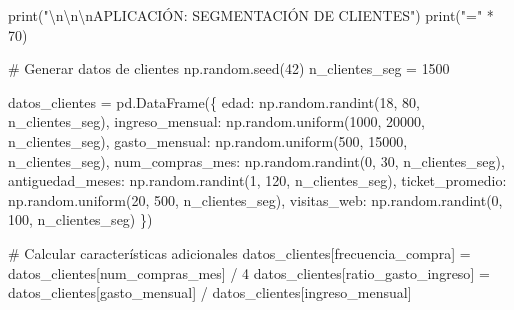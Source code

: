 \documentclass[
  doc,
  floatsintext,
  longtable,
  a4paper,
  nolmodern,
  notxfonts,
  notimes,
  12pt,
  colorlinks=true,linkcolor=blue,citecolor=blue,urlcolor=blue]{apa7}
\newenvironment{Shaded}{\begin{snugshade}}{\end{snugshade}}
\newcommand{\BuiltInTok}[1]{\textcolor[rgb]{0.00,0.23,0.31}{#1}}
\newcommand{\CharTok}[1]{\textcolor[rgb]{0.13,0.47,0.30}{#1}}
\newcommand{\CommentTok}[1]{\textcolor[rgb]{0.37,0.37,0.37}{#1}}
\newcommand{\DecValTok}[1]{\textcolor[rgb]{0.68,0.00,0.00}{#1}}
\newcommand{\NormalTok}[1]{\textcolor[rgb]{0.00,0.23,0.31}{#1}}
\newcommand{\OperatorTok}[1]{\textcolor[rgb]{0.37,0.37,0.37}{#1}}
\newcommand{\StringTok}[1]{\textcolor[rgb]{0.13,0.47,0.30}{#1}}
\begin{document}
\begin{Shaded}
\begin{Highlighting}[]
\BuiltInTok{print}\NormalTok{(}\StringTok{"}\CharTok{\textbackslash{}n\textbackslash{}n\textbackslash{}n}\StringTok{APLICACIÓN: SEGMENTACIÓN DE CLIENTES"}\NormalTok{)}
\BuiltInTok{print}\NormalTok{(}\StringTok{"="} \OperatorTok{*} \DecValTok{70}\NormalTok{)}

\CommentTok{\# Generar datos de clientes}
\NormalTok{np.random.seed(}\DecValTok{42}\NormalTok{)}
\NormalTok{n\_clientes\_seg }\OperatorTok{=} \DecValTok{1500}

\NormalTok{datos\_clientes }\OperatorTok{=}\NormalTok{ pd.DataFrame(\{}
    \StringTok{\textquotesingle{}edad\textquotesingle{}}\NormalTok{: np.random.randint(}\DecValTok{18}\NormalTok{, }\DecValTok{80}\NormalTok{, n\_clientes\_seg),}
    \StringTok{\textquotesingle{}ingreso\_mensual\textquotesingle{}}\NormalTok{: np.random.uniform(}\DecValTok{1000}\NormalTok{, }\DecValTok{20000}\NormalTok{, n\_clientes\_seg),}
    \StringTok{\textquotesingle{}gasto\_mensual\textquotesingle{}}\NormalTok{: np.random.uniform(}\DecValTok{500}\NormalTok{, }\DecValTok{15000}\NormalTok{, n\_clientes\_seg),}
    \StringTok{\textquotesingle{}num\_compras\_mes\textquotesingle{}}\NormalTok{: np.random.randint(}\DecValTok{0}\NormalTok{, }\DecValTok{30}\NormalTok{, n\_clientes\_seg),}
    \StringTok{\textquotesingle{}antiguedad\_meses\textquotesingle{}}\NormalTok{: np.random.randint(}\DecValTok{1}\NormalTok{, }\DecValTok{120}\NormalTok{, n\_clientes\_seg),}
    \StringTok{\textquotesingle{}ticket\_promedio\textquotesingle{}}\NormalTok{: np.random.uniform(}\DecValTok{20}\NormalTok{, }\DecValTok{500}\NormalTok{, n\_clientes\_seg),}
    \StringTok{\textquotesingle{}visitas\_web\textquotesingle{}}\NormalTok{: np.random.randint(}\DecValTok{0}\NormalTok{, }\DecValTok{100}\NormalTok{, n\_clientes\_seg)}
\NormalTok{\})}

\CommentTok{\# Calcular características adicionales}
\NormalTok{datos\_clientes[}\StringTok{\textquotesingle{}frecuencia\_compra\textquotesingle{}}\NormalTok{] }\OperatorTok{=}\NormalTok{ datos\_clientes[}\StringTok{\textquotesingle{}num\_compras\_mes\textquotesingle{}}\NormalTok{] }\OperatorTok{/} \DecValTok{4}
\NormalTok{datos\_clientes[}\StringTok{\textquotesingle{}ratio\_gasto\_ingreso\textquotesingle{}}\NormalTok{] }\OperatorTok{=}\NormalTok{ datos\_clientes[}\StringTok{\textquotesingle{}gasto\_mensual\textquotesingle{}}\NormalTok{] }\OperatorTok{/}\NormalTok{ datos\_clientes[}\StringTok{\textquotesingle{}ingreso\_mensual\textquotesingle{}}\NormalTok{]}


\end{Highlighting}
\end{Shaded}
\end{document}
